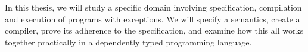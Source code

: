 In this thesis, we will study a specific domain involving specification, compilation
and execution of programs with exceptions. We will specify
a semantics, create a compiler, prove its adherence to the specification, and examine
how this all works together practically in a dependently typed programming language.








































































